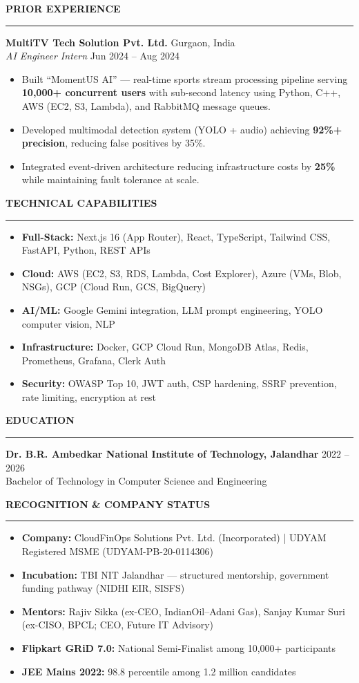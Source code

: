 \documentclass[a4paper,10pt]{article}
\newcommand{\cvsection}[1]{%
  \vspace{2mm}
  \noindent\textbf{\large\MakeUppercase{#1}}
  \vspace{1mm}
  \hrule
  \vspace{1.5mm}
}
\begin{document}
\cvsection{Prior Experience}
\textbf{MultiTV Tech Solution Pvt. Ltd.} \hfill Gurgaon, India \\
\textit{AI Engineer Intern} \hfill Jun 2024 -- Aug 2024
\begin{itemize}
    \item Built ``MomentUS AI'' --- real-time sports stream processing pipeline serving \textbf{10,000+ concurrent users} with sub-second latency using Python, C++, AWS (EC2, S3, Lambda), and RabbitMQ message queues.
    \item Developed multimodal detection system (YOLO + audio) achieving \textbf{92\%+ precision}, reducing false positives by 35\%.
    \item Integrated event-driven architecture reducing infrastructure costs by \textbf{25\%} while maintaining fault tolerance at scale.
\end{itemize}

\cvsection{Technical Capabilities}
\begin{itemize}[itemsep=0.5mm]
    \item \textbf{Full-Stack:} Next.js 16 (App Router), React, TypeScript, Tailwind CSS, FastAPI, Python, REST APIs
    \item \textbf{Cloud:} AWS (EC2, S3, RDS, Lambda, Cost Explorer), Azure (VMs, Blob, NSGs), GCP (Cloud Run, GCS, BigQuery)
    \item \textbf{AI/ML:} Google Gemini integration, LLM prompt engineering, YOLO computer vision, NLP
    \item \textbf{Infrastructure:} Docker, GCP Cloud Run, MongoDB Atlas, Redis, Prometheus, Grafana, Clerk Auth
    \item \textbf{Security:} OWASP Top 10, JWT auth, CSP hardening, SSRF prevention, rate limiting, encryption at rest
\end{itemize}

\cvsection{Education}
\textbf{Dr. B.R. Ambedkar National Institute of Technology, Jalandhar} \hfill 2022 -- 2026 \\
Bachelor of Technology in Computer Science and Engineering

\cvsection{Recognition \& Company Status}
\begin{itemize}[itemsep=0.5mm]
    \item \textbf{Company:} CloudFinOps Solutions Pvt. Ltd. (Incorporated) | UDYAM Registered MSME (UDYAM-PB-20-0114306)
    \item \textbf{Incubation:} TBI NIT Jalandhar --- structured mentorship, government funding pathway (NIDHI EIR, SISFS)
    \item \textbf{Mentors:} Rajiv Sikka (ex-CEO, IndianOil--Adani Gas), Sanjay Kumar Suri (ex-CISO, BPCL; CEO, Future IT Advisory)
    \item \textbf{Flipkart GRiD 7.0:} National Semi-Finalist among 10,000+ participants
    \item \textbf{JEE Mains 2022:} 98.8 percentile among 1.2 million candidates
\end{itemize}
\end{document}

